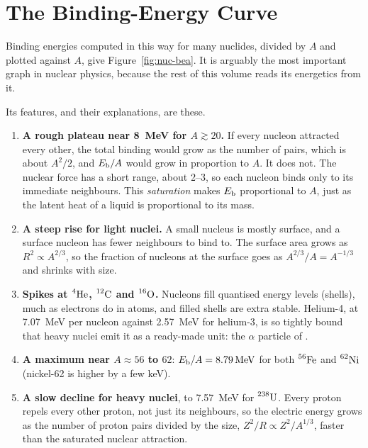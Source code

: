 \section{The Binding-Energy Curve}\label{sec:nuc-curve}

Binding energies computed in this way for many nuclides, divided by $A$ and plotted against $A$, give
Figure~\ref{fig:nuc-bea}. It is arguably the most important graph in nuclear physics, because the rest
of this volume reads its energetics from it.

\begin{figure}[htbp]
\centering
{}
\end{figure}

Its features, and their explanations, are these.
\begin{enumerate}[label=(\alph*)]
\item \textbf{A rough plateau near \SI{8}{\MeV} for $A\gtrsim20$.} If every nucleon attracted every other,
the total binding would grow as the number of pairs, which is about $A^2/2$, and $E_{\mathrm{b}}/A$ would grow in
proportion to $A$. It does not. The nuclear force has a short range, about \SIrange{2}{3}{\fm}, so each
nucleon binds only to its immediate neighbours. This \emph{saturation} makes $E_{\mathrm{b}}$ proportional to $A$,
just as the latent heat of a liquid is proportional to its mass.
\item \textbf{A steep rise for light nuclei.} A small nucleus is mostly surface, and a surface nucleon
has fewer neighbours to bind to. The surface area grows as $R^2\propto A^{2/3}$, so the fraction of
nucleons at the surface goes as $A^{2/3}/A=A^{-1/3}$ and shrinks with size.
\item \textbf{Spikes at $\prescript{4}{}{\mathrm{He}}$, $\prescript{12}{}{\mathrm{C}}$ and $\prescript{16}{}{\mathrm{O}}$.} Nucleons fill quantised energy
levels (shells), much as electrons do in atoms, and filled shells are extra stable. Helium-4, at
\SI{7.07}{\MeV} per nucleon against \SI{2.57}{\MeV} for helium-3, is so tightly bound that heavy nuclei
emit it as a ready-made unit: the $\alpha$ particle of .
\item \textbf{A maximum near $A\approx56$ to $62$}: $\Eb/A=\SI{8.79}{\MeV}$ for both $\prescript{56}{}{\mathrm{Fe}}$ and
$\prescript{62}{}{\mathrm{Ni}}$ (nickel-62 is higher by a few \si{\keV}).
\item \textbf{A slow decline for heavy nuclei}, to \SI{7.57}{\MeV} for $\prescript{238}{}{\mathrm{U}}$. Every proton repels
every other proton, not just its neighbours, so the electric energy grows as the number of proton pairs
divided by the size, $Z^2/R\propto Z^2/A^{1/3}$, faster than the saturated nuclear attraction.
\end{enumerate}

